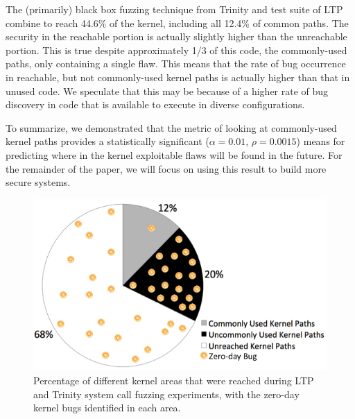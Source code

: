 The (primarily) black box fuzzing technique from Trinity and test suite of
LTP combine to reach 44.6\% of the kernel, including all 12.4\% of common
paths.  The security in the reachable portion is actually
slightly higher than the unreachable portion.  This is true despite
approximately 1/3 of this code, the commonly-used paths, only containing
a single flaw.  This means that the rate of bug occurrence in reachable, but
not commonly-used kernel paths is actually higher than that in unused
code.  We speculate that this may be because of a higher rate of bug discovery
in code that is available to execute in diverse configurations.


To summarize, we demonstrated that the metric of looking at commonly-used
kernel paths provides a statistically significant ($\alpha=0.01$,
$\rho=0.0015$) means for predicting where in the kernel exploitable flaws
will be found in the future.  For the remainder of the paper, we will
focus on using this result to build more secure systems.


\begin{figure}%
\centering
\includegraphics[width=1.0\columnwidth]{diagram/kernel_coverage.png}
\caption{\small Percentage of different kernel areas that were reached during
 LTP and Trinity system call fuzzing experiments, with the zero-day kernel bugs identified
 in each area.}
\label{fig:coverage}
\end{figure}